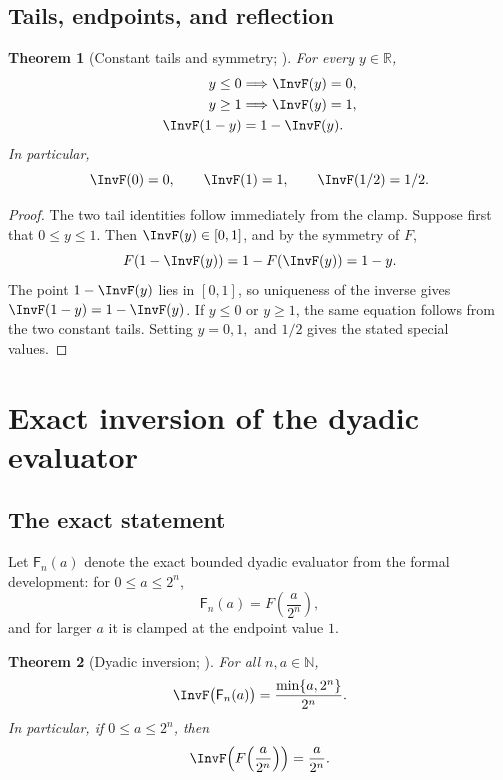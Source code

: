 \documentclass[11pt,oneside]{article}
\newtheorem{theorem}{Theorem}[section]
\theoremstyle{definition}
\theoremstyle{remark}
\newcommand{\R}{\mathbb R}
\newcommand{\N}{\mathbb N}
\begin{document}
\subsection{Tails, endpoints, and reflection}

\begin{theorem}[Constant tails and symmetry; \Formalized]
\label{inverse:thm:inverse-symmetry}
For every $y\in\R$,
\begin{align}
 y\leq0&\Longrightarrow \InvF(y)=0,\\
 y\geq1&\Longrightarrow \InvF(y)=1,\\
 \InvF(1-y)&=1-\InvF(y). \label{inverse:eq:inv-reflection}
\end{align}
In particular,
\[
 \InvF(0)=0,\qquad \InvF(1)=1,\qquad \InvF(1/2)=1/2.
\]
\end{theorem}

\begin{proof}
The two tail identities follow immediately from the clamp.  Suppose first
that $0\leq y\leq1$.  Then $\InvF(y)\in[0,1]$, and by the symmetry of $F$,
\[
 F(1-\InvF(y))
   =1-F(\InvF(y))
   =1-y.
\]
The point $1-\InvF(y)$ lies in $[0,1]$, so uniqueness of the inverse gives
$\InvF(1-y)=1-\InvF(y)$.  If $y\leq0$ or $y\geq1$, the same equation follows
from the two constant tails.  Setting $y=0,1,$ and $1/2$ gives the stated
special values.
\end{proof}

\section{Exact inversion of the dyadic evaluator}
\label{inverse:sec:dyadic-inverse}

\subsection{The exact statement}

Let $\mathsf F_n(a)$ denote the exact bounded dyadic evaluator from the
formal development: for $0\leq a\leq2^n$,
\[
 \mathsf F_n(a)=F\!\left(\frac{a}{2^n}\right),
\]
and for larger $a$ it is clamped at the endpoint value $1$.

\begin{theorem}[Dyadic inversion; \Formalized]
\label{inverse:thm:dyadic-inversion}
For all $n,a\in\N$,
\[
 \InvF\bigl(\mathsf F_n(a)\bigr)
 =\frac{\min\{a,2^n\}}{2^n}.
\]
In particular, if $0\leq a\leq2^n$, then
\[
 \InvF\!\left(F\!\left(\frac a{2^n}\right)\right)=\frac a{2^n}.
\]
\end{theorem}
\end{document}
